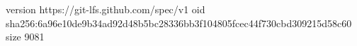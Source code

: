 version https://git-lfs.github.com/spec/v1
oid sha256:6a96e10de9b34ad92d48b5bc28336bb3f104805fcec44f730cbd309215d58c60
size 9081
